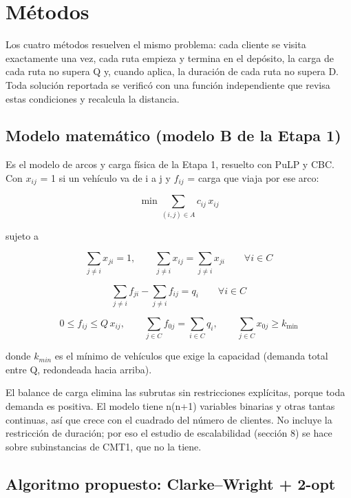 \documentclass[11pt,letterpaper]{article}
\begin{document}
\hypertarget{muxe9todos}{%
\section{Métodos}\label{muxe9todos}}

Los cuatro métodos resuelven el mismo problema: cada cliente se visita exactamente una vez, cada ruta empieza y termina en el depósito, la carga de cada ruta no supera Q y, cuando aplica, la duración de cada ruta no supera D. Toda solución reportada se verificó con una función independiente que revisa estas condiciones y recalcula la distancia.

\hypertarget{modelo-matemuxe1tico-modelo-b-de-la-etapa-1}{%
\subsection{Modelo matemático (modelo B de la Etapa 1)}\label{modelo-matemuxe1tico-modelo-b-de-la-etapa-1}}

Es el modelo de arcos y carga física de la Etapa 1, resuelto con PuLP y CBC. Con \(x_{ij}\) = 1 si un vehículo va de i a j y \(f_{ij}\) = carga que viaja por ese arco:

\[\min \sum_{(i,j)\in A} c_{ij}\,x_{ij}\]

sujeto a

\[\sum_{j\ne i} x_{ji} = 1,\qquad \sum_{j\ne i} x_{ij}=\sum_{j\ne i} x_{ji}\qquad \forall i\in C\]

\[\sum_{j\ne i} f_{ji}-\sum_{j\ne i} f_{ij}=q_i\qquad \forall i\in C\]

\[0\le f_{ij}\le Q\,x_{ij},\qquad \sum_{j\in C} f_{0j}=\sum_{i\in C} q_i,\qquad \sum_{j\in C}x_{0j}\ge k_{\min}\]

donde \(k_{min}\) es el mínimo de vehículos que exige la capacidad (demanda total entre Q, redondeada hacia arriba).

El balance de carga elimina las subrutas sin restricciones explícitas, porque toda demanda es positiva. El modelo tiene n(n+1) variables binarias y otras tantas continuas, así que crece con el cuadrado del número de clientes. No incluye la restricción de duración; por eso el estudio de escalabilidad (sección 8) se hace sobre subinstancias de CMT1, que no la tiene.

\hypertarget{algoritmo-propuesto-clarkewright-2-opt}{%
\subsection{Algoritmo propuesto: Clarke--Wright + 2-opt}\label{algoritmo-propuesto-clarkewright-2-opt}}
\end{document}
